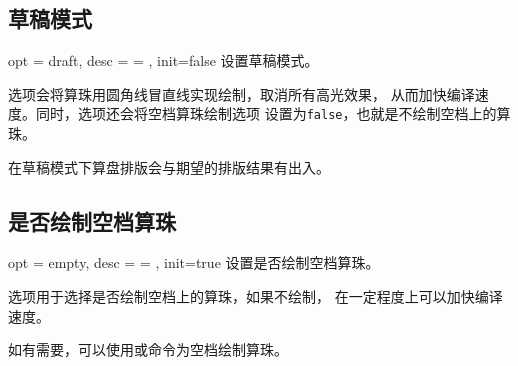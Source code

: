 \documentclass[full]{l3doc}
\begin{document}
\begin{documentation}
\subsection{草稿模式}

\begin{option}{ opt = draft, desc = {= }, init=false }
  设置草稿模式。
\end{option}

  选项会将算珠用圆角线冒直线实现绘制，取消所有高光效果，
  从而加快编译速度。同时，选项还会将空档算珠绘制选项%
  设置为\texttt{false}，也就是不绘制空档上的算珠。

  \begin{notezh}
    在草稿模式下算盘排版会与期望的排版结果有出入。
  \end{notezh}

\begin{SideBySideExample}[frame=single,numbers=left,%
                xrightmargin=.53\linewidth,gobble=2]
  \centering
  \begin{suanpan}[draft]
  \end{suanpan}
\end{SideBySideExample}


\subsection{是否绘制空档算珠}

\begin{option}{ opt = empty, desc = {= }, init=true }
  设置是否绘制空档算珠。
\end{option}

  选项用于选择是否绘制空档上的算珠，如果不绘制，
  在一定程度上可以加快编译速度。

  \begin{notezh}
    如有需要，可以使用或命令为空档绘制算珠。
  \end{notezh}

\begin{SideBySideExample}[frame=single,numbers=left,%
                xrightmargin=.53\linewidth,gobble=2]
  \centering
  \begin{suanpan}[empty = false]
  \end{suanpan}
\end{SideBySideExample}


\end{documentation}
\end{document}
